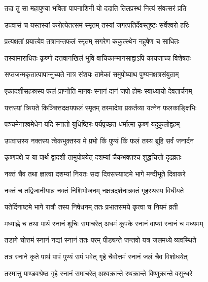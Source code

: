 \twolineshloka
{तदा तु सा महापुण्या भविता पापनाशिनी}
{यो ददाति तिलप्रस्थं नित्यं संवत्सरं प्रति}%

\twolineshloka
{उपवासं च यस्तस्यां करोत्येतत्समं स्मृतम्}
{तस्यां जगत्पतिर्देवस्तुष्टः सर्वेश्वरो हरिः}%

\twolineshloka
{प्रत्यक्षतां प्रयात्येव तत्रानन्तफलं स्मृतम्}
{सगरेण ककुत्स्थेन नहुषेण च साधितः}%

\twolineshloka
{तस्यामाराधितः कृष्णो दत्तवानखिलं भुवि}
{वाचिकान्मानसाद्वाऽपि कायजाच्च विशेषतः}%

\twolineshloka
{सप्तजन्मकृतात्पापान्मुच्यते नात्र संशयः}
{तामेकां समुपोष्याथ पुण्यनक्षत्रसंयुताम्}%

\twolineshloka
{एकादशीसहस्रस्य फलं प्राप्नोति मानवः}
{स्नानं दानं जपो होमः स्वाध्यायो देवतार्चनम्}%

\twolineshloka
{यत्तस्यां क्रियते किञ्चित्तदक्षयफलं स्मृतम्}
{तस्मादेषा प्रकर्तव्या यत्नेन फलकाङ्क्षिभिः}%

\twolineshloka
{पञ्चमेनाश्वमेधेन यदि स्नातो युधिष्ठिरः}
{पर्यपृच्छत धर्मात्मा कृष्णं यदुकुलोद्वहम्}%


\twolineshloka
{उपवासस्य नक्तस्य त्वेकभुक्तस्य मे प्रभो}
{किं पुण्यं किं फलं तस्य ब्रूहि सर्वं जनार्दन}%


\twolineshloka
{कृष्णपक्षे च या पार्थ द्वादशी तामुपोषयेत्}
{दशम्यां चैकभक्तश्च शुद्धचित्तो दृढव्रतः}%

\twolineshloka
{नक्तं चैव तथा ज्ञात्वा दशम्यां नियतः सदा}
{दिवसस्याष्टमे भागे मन्दीभूते दिवाकरे}%

\twolineshloka
{नक्तं च तद्विजानीयान्न नक्तं निशिभोजनम्}
{नक्षत्रदर्शनान्नक्तं गृहस्थस्य विधीयते}%

\twolineshloka
{यतेर्दिनाष्टमे भागे रात्रौ तस्य निषेधनम्}
{ततः प्रभातसमये कृत्वा च नियमं व्रती}%

\twolineshloka
{मध्याह्ने च तथा पार्थ स्नानं शुचिः समाचरेत्}
{अधमं कूपके स्नानं वाप्यां स्नानं च मध्यमम्}%

\twolineshloka
{तडागे चोत्तमं स्नानं नद्यां स्नानं ततः परम्}
{पीड्यन्ते जन्तवो यत्र जलमध्ये व्यवस्थिते}%

\twolineshloka
{तत्र स्नाने कृते पार्थ पापं पुण्यं समं भवेत्}
{गृहे चैवोत्तमं स्नानं जलं चैव विशोधयेत्}%

\twolineshloka
{तस्मात्तु पाण्डवश्रेष्ठ गृहे स्नानं समाचरेत्}
{अश्वक्रान्ते रथक्रान्ते विष्णुक्रान्ते वसुन्धरे}%


